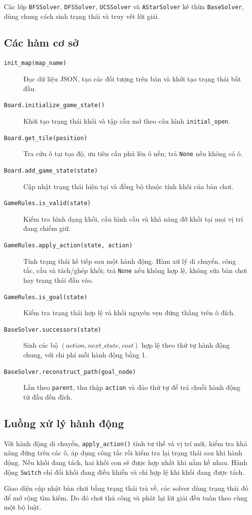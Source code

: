 Các lớp \texttt{BFSSolver}, \texttt{DFSSolver}, \texttt{UCSSolver}
và \texttt{AStarSolver} kế thừa \texttt{BaseSolver}, dùng chung
cách sinh trạng thái và truy vết lời giải.

\subsection{Các hàm cơ sở}
\begin{description}
    \item[\texttt{init\_map(map\_name)}]
    Đọc dữ liệu JSON, tạo các đối tượng trên bàn và khởi tạo
    trạng thái bắt đầu.

    \item[\texttt{Board.initialize\_game\_state()}]
    Khởi tạo trạng thái khối và tập cầu mở theo cấu hình
    \texttt{initial\_open}.

    \item[\texttt{Board.get\_tile(position)}]
    Tra cứu ô tại tọa độ, ưu tiên cầu phủ lên ô nền;
    trả \texttt{None} nếu không có ô.

    \item[\texttt{Board.add\_game\_state(state)}]
    Cập nhật trạng thái hiện tại và đồng bộ thuộc tính khối
    của bàn chơi.

    \item[\texttt{GameRules.is\_valid(state)}]
    Kiểm tra hình dạng khối, cấu hình cầu và khả năng đỡ khối
    tại mọi vị trí đang chiếm giữ.

    \item[\texttt{GameRules.apply\_action(state, action)}]
    Tính trạng thái kế tiếp sau một hành động. Hàm xử lý di chuyển,
    công tắc, cầu và tách/ghép khối; trả \texttt{None} nếu không hợp lệ,
    không sửa bàn chơi hay trạng thái đầu vào.

    \item[\texttt{GameRules.is\_goal(state)}]
    Kiểm tra trạng thái hợp lệ và khối nguyên vẹn đứng thẳng
    trên ô đích.

    \item[\texttt{BaseSolver.successors(state)}]
    Sinh các bộ $(action,next\_state,cost)$ hợp lệ theo thứ tự
    hành động chung, với chi phí mỗi hành động bằng 1.

    \item[\texttt{BaseSolver.reconstruct\_path(goal\_node)}]
    Lần theo \texttt{parent}, thu thập \texttt{action} và đảo
    thứ tự để trả chuỗi hành động từ đầu đến đích.
\end{description}

\subsection{Luồng xử lý hành động}
Với hành động di chuyển, \texttt{apply\_action()} tính tư thế và vị trí mới, kiểm tra khả năng đứng trên các ô, áp dụng công tắc rồi kiểm
tra lại trạng thái sau khi hành động. Nếu khối đang tách, hai khối con sẽ được hợp nhất khi nằm kề nhau. Hành động \texttt{Switch} chỉ đổi
khối đang điều khiển và chỉ hợp lệ khi khối đang được tách.

Giao diện cập nhật bàn chơi bằng trạng thái trả về, các solver dùng trạng thái đó để mở rộng tìm kiếm. Do đó chơi thủ công và phát lại lời
giải đều tuân theo cùng một bộ luật.
